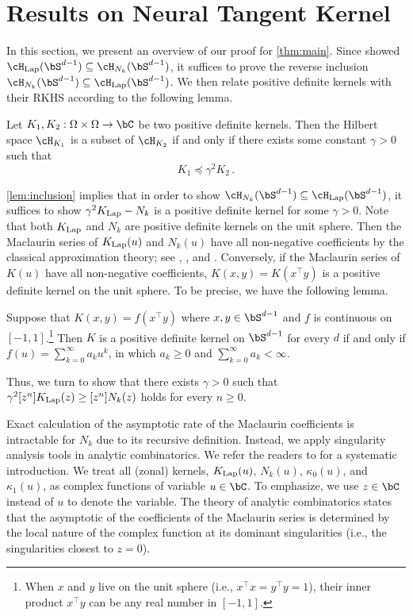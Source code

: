 \documentclass[11pt]{article}
\newcommand{\g}{\kappa_1}
\newcommand{\hlap}{\cH_{\textnormal{Lap}}}
\newcommand{\klap}{K_{\textnormal{Lap}}}
\begin{document}
\section{Results on Neural Tangent Kernel}

In this section, we present an overview of our proof for \cref{thm:main}. 
Since \citep{geifman2020similarity} showed $\hlap(\bS^{d-1})\subseteq \cH_{N_k}(\bS^{d-1})$, it suffices to prove the reverse inclusion $\cH_{N_k}(\bS^{d-1}) \subseteq \hlap(\bS^{d-1})$. We then relate positive definite kernels with their RKHS according to the following lemma.

\begin{lemma}\label{lem:inclusion}
Let $K_1,K_2:\Omega\times \Omega \to \bC$ be two positive definite kernels. Then the Hilbert space $\cH_{K_1}$ is a subset of $\cH_{K_2}$ if and only if there exists some constant $\gamma>0$ such that \[
K_1  \preccurlyeq \gamma^2 K_2\,.
\]
\end{lemma}

\cref{lem:inclusion} implies that in order to show $\cH_{N_k}(\bS^{d-1})\subseteq \hlap(\bS^{d-1})$, it suffices to show $\gamma^2 \klap - N_k$ is a positive definite kernel for some $\gamma>0$. Note that both $\klap$ and $N_k$ are positive definite kernels on the unit sphere. Then the Maclaurin series of $\klap(u)$ and $N_k(u)$ have all non-negative coefficients by the classical approximation theory; see \cite[Theorem 2]{schoenberg1942positive}, \cite{bingham1973positive}, and \cite[Chapter 17]{cheney2009course}. Conversely, if the Maclaurin series of $K(u)$ have all non-negative coefficients, $K(x,y) = K(x^\top y)$ is a positive definite kernel on the unit sphere. To be precise, we have the following lemma.
\begin{lemma}
Suppose that $K(x,y) = f(x^\top y)$ where $x,y\in \bS^{d-1}$ and $f$ is continuous on $[-1,1]$.\footnote{When $x$ and $y$ live on the unit sphere (i.e., $x^{\top}x=y^{\top}y=1$), their inner product $x^\top y$ can be any real number in $[-1,1]$.} Then $K$ is a positive definite kernel on $\bS^{d-1}$ for every $d$ if and only if $f(u)=\sum_{k=0}^\infty a_k u^k$, in which $a_k\ge 0$ and $\sum_{k=0}^\infty a_k < \infty$.
\end{lemma}
Thus, we turn to show that there exists $\gamma>0$ such that $\gamma^2 [z^n]\klap(z) \ge [z^n]N_k(z)$ holds for every $n\ge 0$.  

Exact calculation of the asymptotic rate of the Maclaurin coefficients is intractable for $N_k$ due to its recursive definition. Instead, we apply singularity analysis tools in analytic combinatorics. We refer the readers to \citep{flajolet2009analytic} for a systematic introduction. We treat all (zonal) kernels, $\klap(u)$, $N_k(u)$, $\kappa_0(u)$, and $\g(u)$, as complex functions of variable $u\in \bC$. To emphasize, we use $z\in \bC$ instead of $u$ to denote the variable.   The theory of analytic combinatorics states that the asymptotic of the coefficients of the Maclaurin series is determined by the local nature of the complex function at its dominant singularities (i.e., the singularities closest to $z=0$). 
\end{document}
